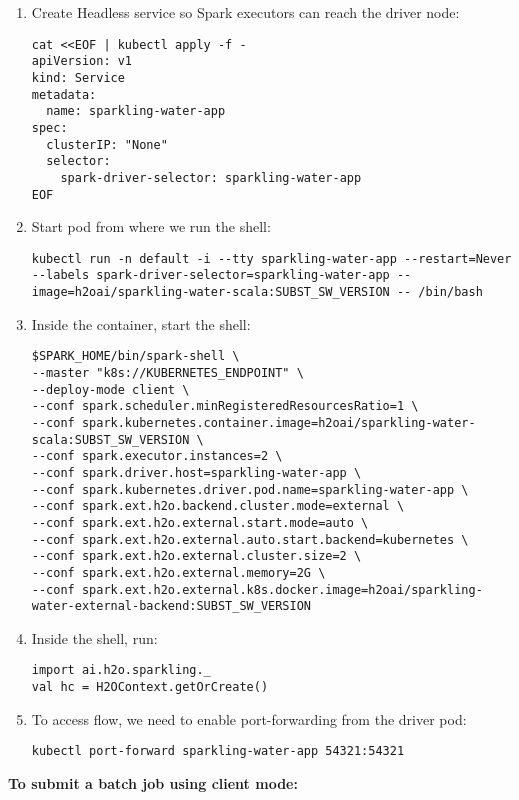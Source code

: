 \begin{enumerate}
    \item Create Headless service so Spark executors can reach the driver node:
    \begin{lstlisting}[style=Bash]
cat <<EOF | kubectl apply -f -
apiVersion: v1
kind: Service
metadata:
  name: sparkling-water-app
spec:
  clusterIP: "None"
  selector:
    spark-driver-selector: sparkling-water-app
EOF
    \end{lstlisting}
    \item Start pod from where we run the shell:
    \begin{lstlisting}[style=Bash]
kubectl run -n default -i --tty sparkling-water-app --restart=Never --labels spark-driver-selector=sparkling-water-app --image=h2oai/sparkling-water-scala:SUBST_SW_VERSION -- /bin/bash
    \end{lstlisting}
    \item Inside the container, start the shell:
    \begin{lstlisting}[style=Bash]
$SPARK_HOME/bin/spark-shell \
--master "k8s://KUBERNETES_ENDPOINT" \
--deploy-mode client \
--conf spark.scheduler.minRegisteredResourcesRatio=1 \
--conf spark.kubernetes.container.image=h2oai/sparkling-water-scala:SUBST_SW_VERSION \
--conf spark.executor.instances=2 \
--conf spark.driver.host=sparkling-water-app \
--conf spark.kubernetes.driver.pod.name=sparkling-water-app \
--conf spark.ext.h2o.backend.cluster.mode=external \
--conf spark.ext.h2o.external.start.mode=auto \
--conf spark.ext.h2o.external.auto.start.backend=kubernetes \
--conf spark.ext.h2o.external.cluster.size=2 \
--conf spark.ext.h2o.external.memory=2G \
--conf spark.ext.h2o.external.k8s.docker.image=h2oai/sparkling-water-external-backend:SUBST_SW_VERSION
    \end{lstlisting}
    \item Inside the shell, run:
    \begin{lstlisting}[style=Scala]
import ai.h2o.sparkling._
val hc = H2OContext.getOrCreate()
    \end{lstlisting}
    \item To access flow, we need to enable port-forwarding from the driver pod:
    \begin{lstlisting}[style=Bash]
kubectl port-forward sparkling-water-app 54321:54321
    \end{lstlisting}
\end{enumerate}

\textbf{To submit a batch job using client mode:}

